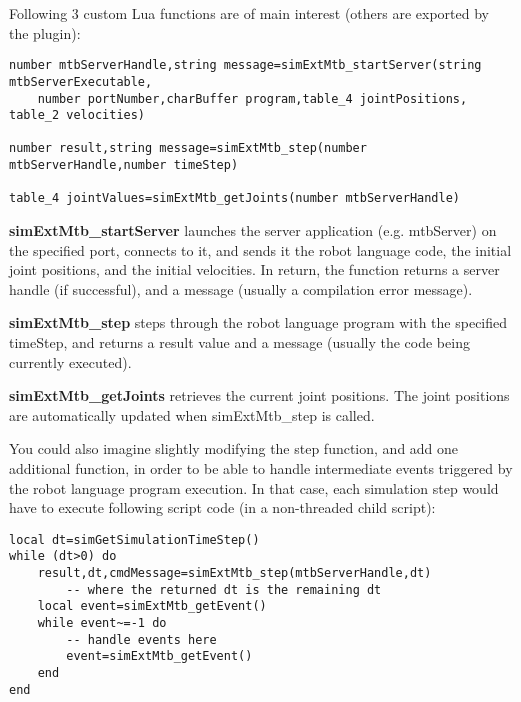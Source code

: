 Following 3 custom Lua functions are of main interest (others are exported 
by the plugin): 

\begin{lstlisting}
number mtbServerHandle,string message=simExtMtb_startServer(string mtbServerExecutable,
    number portNumber,charBuffer program,table_4 jointPositions, table_2 velocities)

number result,string message=simExtMtb_step(number mtbServerHandle,number timeStep)

table_4 jointValues=simExtMtb_getJoints(number mtbServerHandle)
\end{lstlisting}
\begin{description}[nosep]
	\item{\textbf{simExtMtb\_startServer}}
		launches the server application (e.g. mtbServer) on the specified 
		port, connects to it, and sends it the robot language code, the 
		initial joint positions, and the initial velocities. In return,
		the function returns a server handle (if successful), and a message
		(usually a compilation error message).
	\item{\textbf{simExtMtb\_step}}
		steps through the robot language program with the specified timeStep,
		and returns a result value and a message (usually the code being
		currently executed).
	\item{\textbf{simExtMtb\_getJoints}}
		retrieves the current joint positions. The joint positions are 
		automatically updated when simExtMtb\_step is called.
\end{description}

You could also imagine slightly modifying the step function, and add one 
additional function, in order to be able to handle intermediate events 
triggered by the robot language program execution. In that case, each 
simulation step would have to execute following script code (in a 
non-threaded child script):

\begin{lstlisting}
local dt=simGetSimulationTimeStep()
while (dt>0) do
    result,dt,cmdMessage=simExtMtb_step(mtbServerHandle,dt) 
		-- where the returned dt is the remaining dt
    local event=simExtMtb_getEvent()
    while event~=-1 do
        -- handle events here
        event=simExtMtb_getEvent()
    end
end
\end{lstlisting}

